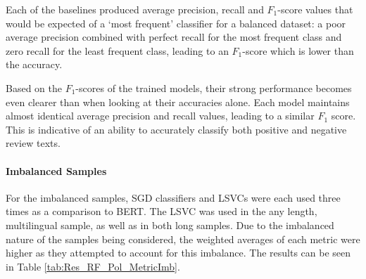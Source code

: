 Each of the baselines produced average precision, recall and $F_1$-score values that would be expected of a `most frequent' classifier for a balanced dataset: a poor average precision combined with perfect recall for the most frequent class and zero recall for the least frequent class, leading to an $F_1$-score which is lower than the accuracy.

Based on the $F_1$-scores of the trained models, their strong performance becomes even clearer than when looking at their accuracies alone. Each model maintains almost identical average precision and recall values, leading to a similar $F_1$ score. This is indicative of an ability to accurately classify both positive and negative review texts.

\paragraph{Imbalanced Samples}

For the imbalanced samples, SGD classifiers and LSVCs were each used three times as a comparison to BERT. The LSVC was used in the any length, multilingual sample, as well as in both long samples. Due to the imbalanced nature of the samples being considered, the weighted averages of each metric were higher as they attempted to account for this imbalance. The results can be seen in Table \ref{tab:Res_RF_Pol_MetricImb}.

